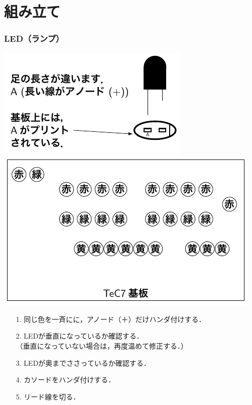 \documentclass{beamer}                 %
\begin{document}
\section{組み立て}
\begin{frame}
  \frametitle{LED（ランプ）}
  \vfill
  \centerline{\includegraphics[scale=0.65]{../Tikz/leds.pdf}\hspace{2cm}
    \includegraphics[scale=0.65]{../Tikz/leds2.pdf}}
  \vfill
  \begin{enumerate}
    \item[1.] 同じ色を一斉にに，アノード（＋）だけハンダ付けする．
    \item[2.] LEDが垂直になっているか確認する．\\
      （垂直になっていない場合は，再度温めて修正する．）
    \item[3.] LEDが奥までささっているか確認する．
    \item[4.] カソードをハンダ付けする．
    \item[5.] リード線を切る．
  \end{enumerate}
  \vfill
\end{frame}
\end{document}
